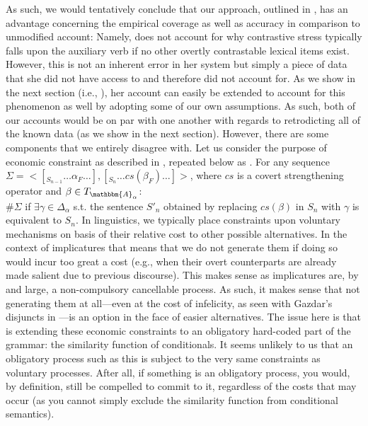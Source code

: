 As such, we would tentatively conclude that our approach, outlined in , has an advantage concerning the empirical coverage as well as accuracy in comparison to  unmodified account: Namely, \textcite{Ippolito2020} does not account for why contrastive stress typically falls upon the auxiliary verb if no other overtly contrastable lexical items exist. However, this is not an inherent error in her system but simply a piece of data that she did not have access to and therefore did not account for. As we show in the next section (i.e., ), her account can easily be extended to account for this phenomenon as well by adopting some of our own assumptions. As such, both of our accounts would be on par with one another with regards to retrodicting all of the known data (as we show in the next section). However, there are some components that we entirely disagree with. Let us consider the purpose of economic constraint as described in , repeated below as .
\ex{}
For any sequence $\Sigma=<[_{S_{n-1}}\ldots\alpha_F\ldots],[_{S_{n}}\ldots cs(\beta_F)\ldots]>$, where $cs$ is a covert strengthening operator and $\beta\in T_{\mathbbm{A}_\alpha}$:\\
$\#\Sigma$ if $\exists\gamma\in\Delta_\alpha$ s.t. the sentence $S'_n$ obtained by replacing $cs(\beta)$ in $S_n$ with $\gamma$ is equivalent to $S_n$.
\xe
In linguistics, we typically place constraints upon voluntary mechanisms on basis of their relative cost to other possible alternatives. In the context of implicatures that means that we do not generate them if doing so would incur too great a cost (e.g., when their overt counterparts are already made salient due to previous discourse). This makes sense as implicatures are, by and large, a non-compulsory cancellable process. As such, it makes sense that not generating them at all---even at the cost of infelicity, as seen with Gazdar's disjuncts in ---is an option in the face of easier alternatives. The issue here is that \textcite{Ippolito2020} is extending these economic constraints to an obligatory hard-coded part of the grammar: the similarity function of conditionals. It seems unlikely to us that an obligatory process such as this is subject to the very same constraints as voluntary processes. After all, if something is an obligatory process, you would, by definition, still be compelled to commit to it, regardless of the costs that may occur (as you cannot simply exclude the similarity function from conditional semantics).

